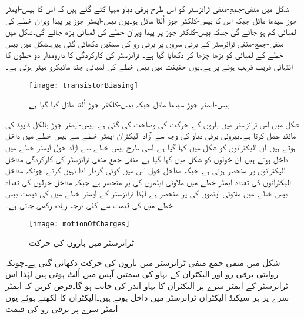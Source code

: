 	شکل   میں منفی-جمع-منفی  ٹرانزسٹر کو اس طرح برقی دباو مہیا کئے گئے ہیں کہ اس کا بیس-ایمٹر    جوڑ سیدھا مائل جبکہ اس کا بیس-کلکٹر   جوڑ اُلٹا مائل ہو۔یوں بیس-ایمٹر   جوڑ پر پیدا ویران  خطے  کی لمبائی کم ہو جائے گی جبکہ بیس-کلکٹر   جوڑ پر پیدا ویران  خطے کی لمبائی بڑھ جائے گی۔شکل میں منفی-جمع-منفی  ٹرانزسٹر کے برقی سروں پر برقی رو کی سمتیں دکھائی گئی ہیں۔شکل میں بیس خطے کے لمبائی کو بڑھا چڑھا کر دکھایا گیا ہے۔ ٹرانزسٹر کی کارکردگی کا دارومدار دو  خطوں کا انتہائی قریب قریب ہونے پر ہے۔یوں حقیقت میں بیس خطے کی لمبائی چند مائیکرو میٹر  ہوتی ہے۔
\begin{figure}
\centering
\texttt{[image: transistorBiasing]}
\caption{ بیس-ایمٹر  جوڑ  سیدھا مائل جبکہ بیس-کلکٹر جوڑ اُلٹا مائل کیا گیا ہے}
\label{شکل_ٹرانزسٹر_مائل_کرنا}
\end{figure}
	شکل   میں اس ٹرانزسٹر میں باروں کے حرکت کی وضاحت کی گئی ہے۔بیس-ایمٹر  جوڑ بالکل ڈایوڈ کی مانند عمل کرتا ہے۔بیرونی برقی دباو کی وجہ سے آزاد الیکٹران ایمٹر خطے سے بیس خطے میں داخل ہوتے ہیں۔ان الیکٹرانوں کو شکل میں  کہا گیا ہے۔اسی طرح بیس خطے سے آزاد خول ایمٹر خطے میں داخل ہوتے ہیں۔ان خولوں کو شکل میں  کہا گیا ہے۔منفی-جمع-منفی ٹرانزسٹر کی کارکردگی مداخل الیکٹرانوں پر منحصر ہوتی ہے جبکہ مداخل خول اس میں کوئی کردار ادا نہیں کرتے۔چونکہ مداخل الیکٹرانوں کی تعداد ایمٹر خطے میں ملاوٹی ایٹموں کی    پر منحصر ہے جبکہ مداخل خولوں کی تعداد بیس خطے میں ملاوٹی ایٹموں کی   پر منحصر ہے لہٰذا ٹرانزسٹر کے ایمٹر خطے میں   کی قیمت  بیس خطے میں  کی قیمت سے کئی درجہ زیادہ رکھی جاتی ہے۔
\begin{figure}
\centering
\texttt{[image: motionOfCharges]}
\caption{ ٹرانزسٹر میں باروں کی حرکت}
\label{شکل_ٹرانزسٹر_میں_چارجوں_کی_حرکت}
\end{figure}
	شکل  میں منفی-جمع-منفی  ٹرانزسٹر میں باروں کی حرکت دکھائی گئی ہے۔چونکہ روایتی برقی رو اور الیکٹران کے بہاو کی سمتیں آپس میں اُلٹ ہوتی ہیں لہٰذا اس ٹرانزسٹر کے ایمٹر سرے پر الیکٹران کا بہاو اندر کی جانب ہو گا۔فرض کریں کہ ایمٹر سرے پر ہر سیکنڈ  الیکٹران ٹرانزسٹر میں داخل ہوتے ہیں۔الیکٹران کا   لکھتے ہوئے یوں ایمٹر سرے پر برقی رو  کی قیمت
